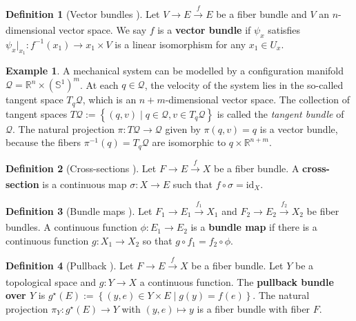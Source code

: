 \documentclass[12pt]{article}
\theoremstyle{definition}
\newtheorem{defn}{Definition}
\newtheorem{example}{Example}
\begin{document}
\begin{defn}[Vector bundles \cite{topology-fiber-bundles}]
    Let \(V \rightarrow E \xrightarrow[]{f} E\) be a fiber bundle and \(V\) an
    \(n\)-dimensional vector space. We say \(f\) is a
    \textbf{vector bundle} if \(\psi_x\) satisfies
    \(\psi_x \vert_{x_1} : f^{-1}(x_1) \rightarrow {x_1}\times V\) is a linear
    isomorphism for any \(x_1 \in U_x\).
\end{defn}

\begin{example}
    A mechanical system can be modelled by a configuration manifold
    \(\mathcal{Q} = \mathbb{R}^n \times (\mathbb{S}^1)^m\). At each
    \(q \in \mathcal{Q}\), the velocity of the system lies in the so-called
    tangent space \(T_q\mathcal{Q}\), which is an \(n+m\)-dimensional vector
    space. 
    The collection of tangent spaces
    \(T\mathcal{Q} := \left\{(q,v) \mid q \in \mathcal{Q}, v \in
    T_q\mathcal{Q}\right\}\) is called the \textit{tangent bundle} of
    \(\mathcal{Q}\). The natural
    projection \(\pi : T\mathcal{Q} \rightarrow \mathcal{Q}\) given by 
    \(\pi(q,v) = q\) is a vector bundle, because the fibers 
    \(\pi^{-1}(q) = T_q\mathcal{Q}\) are isomorphic to 
    \({q} \times \mathbb{R}^{n+m}\).
\end{example}

\begin{defn}[Cross-sections \cite{topology-fiber-bundles}]
    Let \(F \rightarrow E \xrightarrow[]{f} X\) be a fiber bundle.
    A \textbf{cross-section} is a continuous map \(\sigma : X \rightarrow E\)
    such that \(f \circ \sigma = \text{id}_X\).
\end{defn}

\begin{defn}[Bundle maps \cite{topology-fiber-bundles}]
    Let \(F_1 \rightarrow E_1 \xrightarrow[]{f_1} X_1\) and 
    \(F_2 \rightarrow E_2 \xrightarrow[]{f_2} X_2\) be fiber bundles. A
    continuous function \(\phi : E_1 \rightarrow E_2\) is a \textbf{bundle map}
    if there is a continuous function \(g : X_1 \rightarrow X_2\) so that
    \(g \circ f_1 = f_2 \circ \phi\).
\end{defn}

\begin{defn}[Pullback \cite{topology-fiber-bundles}]
    Let \(F \rightarrow E \xrightarrow[]{f} X\) be a fiber bundle. Let \(Y\) be
    a topological space and \(g : Y \rightarrow X\) a continuous function. The
    \textbf{pullback bundle over \(Y\)} is 
    \(g^\star(E) := \left\{ (y,e)\in Y \times E \mid g(y) = f(e)\right\}\). The
    natural projection \(\pi_Y : g^\star(E) \rightarrow Y\) with 
    \((y,e) \mapsto y\) is a fiber bundle with fiber \(F\).
\end{defn}
\end{document}
